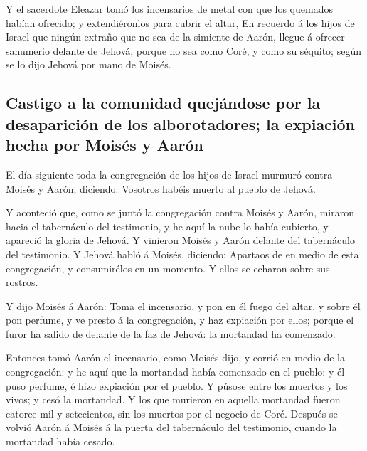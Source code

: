  Y el sacerdote Eleazar tomó los incensarios de metal con
que los quemados habían ofrecido; y extendiéronlos para cubrir el altar,
 En recuerdo á los hijos de Israel que ningún extraño que
no sea de la simiente de Aarón, llegue á ofrecer sahumerio delante de
Jehová, porque no sea como Coré, y como su séquito; según se lo dijo
Jehová por mano de Moisés.

\hypertarget{castigo-a-la-comunidad-quejuxe1ndose-por-la-desapariciuxf3n-de-los-alborotadores-la-expiaciuxf3n-hecha-por-moisuxe9s-y-aaruxf3n}{%
\subsection{Castigo a la comunidad quejándose por la desaparición de los
alborotadores; la expiación hecha por Moisés y
Aarón}\label{castigo-a-la-comunidad-quejuxe1ndose-por-la-desapariciuxf3n-de-los-alborotadores-la-expiaciuxf3n-hecha-por-moisuxe9s-y-aaruxf3n}}

 El día siguiente toda la congregación de los hijos de
Israel murmuró contra Moisés y Aarón, diciendo: Vosotros habéis muerto
al pueblo de Jehová.

 Y aconteció que, como se juntó la congregación contra
Moisés y Aarón, miraron hacia el tabernáculo del testimonio, y he aquí
la nube lo había cubierto, y apareció la gloria de Jehová.
 Y vinieron Moisés y Aarón delante del tabernáculo del
testimonio.  Y Jehová habló á Moisés, diciendo:
 Apartaos de en medio de esta congregación, y
consumirélos en un momento. Y ellos se echaron sobre sus rostros.

 Y dijo Moisés á Aarón: Toma el incensario, y pon en él
fuego del altar, y sobre él pon perfume, y ve presto á la congregación,
y haz expiación por ellos; porque el furor ha salido de delante de la
faz de Jehová: la mortandad ha comenzado.

 Entonces tomó Aarón el incensario, como Moisés dijo, y
corrió en medio de la congregación: y he aquí que la mortandad había
comenzado en el pueblo: y él puso perfume, é hizo expiación por el
pueblo.  Y púsose entre los muertos y los vivos; y cesó
la mortandad.  Y los que murieron en aquella mortandad
fueron catorce mil y setecientos, sin los muertos por el negocio de
Coré.  Después se volvió Aarón á Moisés á la puerta del
tabernáculo del testimonio, cuando la mortandad había cesado.


